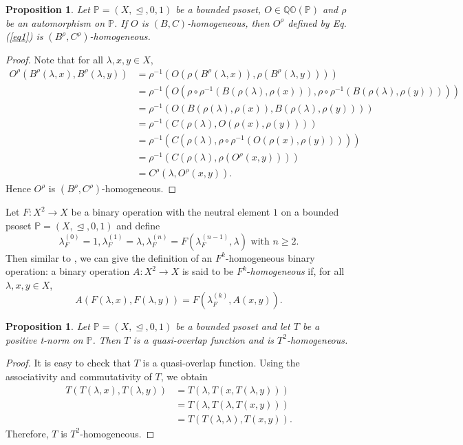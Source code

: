 \documentclass[preprint,12pt]{elsarticle}
\newtheorem{proposition}[theorem]{Proposition}
\begin{document}
\begin{proposition}\label{prop:homogeneity-transport}
Let $\mathbb{P}=(X,\trianglelefteq,0,1)$ be a bounded psoset, $O\in\mathbb{QO}(\mathbb{P})$ and $\rho$ be an automorphism on $\mathbb{P}$. If $O$ is $(B,C)$-homogeneous, then $O^\rho$ defined by Eq.(\ref{eq1}) is $(B^\rho,C^\rho)$-homogeneous.
\end{proposition}

\begin{proof}
Note that for all $\lambda,x,y\in X$,
$$
\begin{aligned}
O^\rho(B^\rho(\lambda,x),B^\rho(\lambda,y))
&=\rho^{-1}\!\left(
 O(\rho(B^{\rho}(\lambda,x)),\rho(B^{\rho}(\lambda,y)))
 \right)\\
&=\rho^{-1}\!\left(
 O(\rho\circ\rho^{-1}(B(\rho(\lambda),\rho(x))),\rho\circ\rho^{-1}(B(\rho(\lambda),\rho(y))))
 \right)\\
 &=\rho^{-1}\!\left(
 O(B(\rho(\lambda),\rho(x)),B(\rho(\lambda),\rho(y)))
 \right)\\
&=\rho^{-1}\!\left(
 C(\rho(\lambda),O(\rho(x),\rho(y)))
 \right)\\
&=\rho^{-1}\!\left(
 C(\rho(\lambda),\rho\circ\rho^{-1}(O(\rho(x),\rho(y))))
 \right)\\
 &=\rho^{-1}\!\left(
 C(\rho(\lambda),\rho(O^{\rho}(x,y)))
 \right)\\
&=C^\rho(\lambda,O^\rho(x,y)).
\end{aligned}$$
Hence $O^\rho$ is $(B^\rho,C^\rho)$-homogeneous.
\end{proof}

Let $F:X^2\to X$ be a binary operation with the neutral element $1$ on a bounded psoset $\mathbb{P}=(X,\trianglelefteq,0,1)$ and define
$$\lambda_F^{(0)}=1, \lambda_F^{(1)}=\lambda, \lambda_F^{(n)}=F(\lambda_F^{(n-1)},\lambda) \mbox{ with }n\ge2.$$
Then similar to \cite{Qiao2021}, we can give the definition of an $F^k$-homogeneous binary operation: a binary operation $A:X^2\to X$ is said to be $F^k$-\emph{homogeneous} if, for all $\lambda,x,y\in X$,
$$
 A(F(\lambda,x),F(\lambda,y))
 =F(\lambda_F^{(k)},A(x,y)).
$$

\begin{proposition}\label{prop:tnorm-homogeneous}
Let $\mathbb{P}=(X,\trianglelefteq,0,1)$ be a bounded psoset and let $T$ be a positive t-norm on $\mathbb{P}$. Then $T$ is a quasi-overlap function and is $T^2$-homogeneous.
\end{proposition}
\begin{proof}
It is easy to check that $T$ is a quasi-overlap function.
Using the associativity and commutativity of $T$, we obtain
$$
\begin{aligned}
T(T(\lambda,x),T(\lambda,y))
&=T(\lambda,T(x,T(\lambda,y)))\\
&=T(\lambda,T(\lambda,T(x,y)))\\
&=T(T(\lambda,\lambda),T(x,y)).
\end{aligned}
$$
Therefore, $T$ is $T^2$-homogeneous.
\end{proof}
\end{document}
